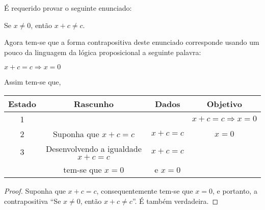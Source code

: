 \begin{exem}\label{exe:DemonstracaoImplicacao4}
	É requerido provar o seguinte enunciado:
	\begin{center}
		Se $x \neq 0$, então $x + c \neq c$.
	\end{center}
	Agora tem-se que a forma contrapositiva deste enunciado corresponde  usando um pouco da linguagem da lógica proposicional a seguinte palavra:
	\begin{center}
		$x + c = c \Rightarrow x = 0$
	\end{center}
	Assim tem-se que,
	\begin{table*}[h]
		\centering
		\begin{tabular}{c|c|c|c}
			\hline
			\rowcolor{cinzaClaro}
			Estado & Rascunho & Dados & Objetivo\\
			\hline
			1 & & & $x + c = c \Rightarrow x = 0$\\
			2 & Suponha que $x + c = c$ & $x + c = c$ & $x = 0$\\
			3 & Desenvolvendo a igualdade $x + c = c$  & $x + c = c$ & \\
			& tem-se que $x = 0$ & e $x = 0$ & \\
			\hline
		\end{tabular}
	\end{table*}
	
	\begin{proof}
		Suponha que $x + c = c$, consequentemente tem-se que $x = 0$, e portanto, a contrapositiva ``Se $x \neq 0$, então $x + c \neq c$''. É também verdadeira.
	\end{proof}
\end{exem}

